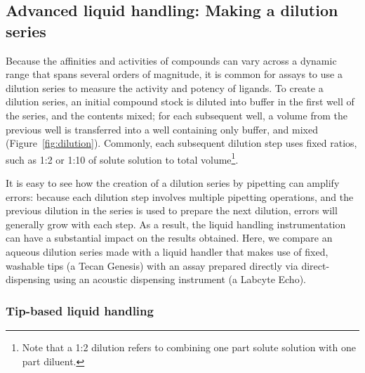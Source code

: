 \documentclass[aps,pre,twocolumn,nofootinbib,superscriptaddress,linenumbers]{revtex4-1}
\begin{document}
\subsection*{Advanced liquid handling: Making a dilution series}

Because the affinities and activities of compounds can vary across a dynamic range that spans several orders of magnitude, it is common for assays to use a dilution series to measure the activity and potency of ligands. 
To create a dilution series, an initial compound stock is diluted into buffer in the first well of the series, and the contents mixed; for each subsequent well, a volume from the previous well is transferred into a well containing only buffer, and mixed (Figure~\ref{fig:dilution}).
Commonly, each subsequent dilution step uses fixed ratios, such as 1:2 or 1:10 of solute solution to total volume\footnote{Note that a 1:2 dilution refers to combining one part solute solution with one part diluent.}.

It is easy to see how the creation of a dilution series by pipetting can amplify errors:
because each dilution step involves multiple pipetting operations, and the previous dilution in the series is used to prepare the next dilution, errors will generally grow with each step.
As a result, the liquid handling instrumentation can have a substantial impact on the results obtained.
Here, we compare an aqueous dilution series made with a liquid handler that makes use of fixed, washable tips (a Tecan Genesis) with an assay prepared directly via direct-dispensing using an acoustic dispensing instrument (a Labcyte Echo).

\subsubsection*{Tip-based liquid handling}
\end{document}
